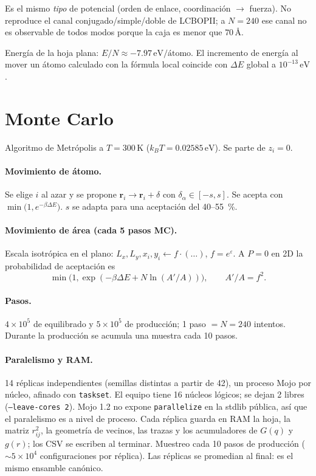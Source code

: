 \documentclass[11pt,a4paper]{article}
\begin{document}
Es el mismo \emph{tipo} de potencial (orden de enlace, coordinación $\to$ fuerza). No reproduce el canal conjugado/simple/doble de LCBOPII; a $N=240$ ese canal no es observable de todos modos porque la caja es menor que $70\,\text{\AA}$.

Energía de la hoja plana: $E/N\approx -7.97\,\mathrm{eV/átomo}$. El incremento de energía al mover un átomo calculado con la fórmula local coincide con $\Delta E$ global a $10^{-13}\,\mathrm{eV}$.

\section{Monte Carlo}

Algoritmo de Metrópolis a $T=300\,\mathrm{K}$ ($k_B T=0.02585\,\mathrm{eV}$). Se parte de $z_i=0$.

\paragraph{Movimiento de átomo.}
Se elige $i$ al azar y se propone
$\mathbf{r}_i\to\mathbf{r}_i+\delta$ con $\delta_\alpha\in[-s,s]$.
Se acepta con $\min\bigl(1,e^{-\beta\Delta E}\bigr)$.
$s$ se adapta para una aceptación del 40--55~\%.

\paragraph{Movimiento de área (cada 5 pasos MC).}
Escala isotrópica en el plano: $L_x,L_y,x_i,y_i\leftarrow f\cdot(\ldots)$, $f=e^{\varepsilon}$.
A $P=0$ en 2D la probabilidad de aceptación es
\[
\min\bigl(1,\exp(-\beta\Delta E+N\ln(A'/A))\bigr),\qquad A'/A=f^2.
\]

\paragraph{Pasos.}
$4\times 10^5$ de equilibrado y $5\times 10^5$ de producción; 1 paso $=N=240$ intentos. Durante la producción se acumula una muestra cada 10 pasos.

\paragraph{Paralelismo y RAM.}
14 réplicas independientes (semillas distintas a partir de 42), un proceso Mojo por núcleo, afinado con \texttt{taskset}. El equipo tiene 16 núcleos lógicos; se dejan 2 libres (\texttt{--leave-cores 2}). Mojo 1.2 no expone \texttt{parallelize} en la stdlib pública, así que el paralelismo es a nivel de proceso. Cada réplica guarda en RAM la hoja, la matriz $r_{ij}^2$, la geometría de vecinos, las trazas y los acumuladores de $G(q)$ y $g(r)$; los CSV se escriben al terminar. Muestreo cada 10 pasos de producción ($\sim 5\times 10^4$ configuraciones por réplica). Las réplicas se promedian al final: es el mismo ensamble canónico.
\end{document}
